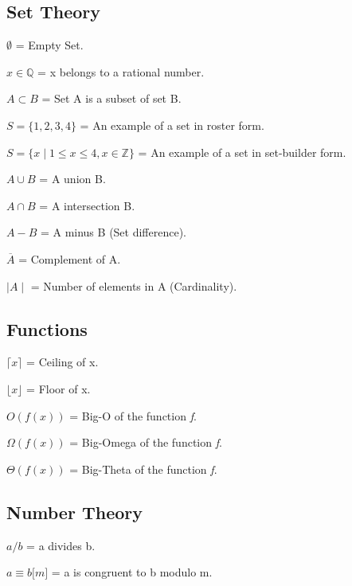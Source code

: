 
\subsection{Set Theory}
\begin{symbollist}
    \item[$\emptyset$] = Empty Set.
    \item[$ x \in \mathbb{Q}$] = x belongs to a rational number.
    \item[$A \subset B$] = Set A is a subset of set B.
    \item[$S = \{1,2,3,4\}$] =  An example of a set in roster form.
    \item[$S = \{x \mid 1 \leq x \leq 4, x \in \mathbb{Z}\}$] = An example of a
        set in set-builder form.
    \item[$A \cup B$] = A union B.
    \item[$A \cap B$] = A intersection B.
    \item[$A - B$] = A minus B (Set difference).
    \item[$\overline{A}$] = Complement of A.
    \item[$\mid A \mid$] = Number of elements in A (Cardinality).
\end{symbollist}


\subsection{Functions}
\begin{symbollist}
    \item[$\lceil x \rceil $] = Ceiling of x.
    \item[$\lfloor x \rfloor$] = Floor of x.
    \item[$O(f(x))$] = Big-O of the function \emph{f}.
    \item[$\Omega(f(x))$] = Big-Omega of the function \emph{f}.
    \item[$\Theta(f(x))$] = Big-Theta of the function \emph{f}.
\end{symbollist}

\subsection{Number Theory}
\begin{symbollist}
    \item[$a / b$] = a divides b.
    \item[$a \equiv b \lbrack m \rbrack$] = a is congruent to b modulo m.
\end{symbollist}

